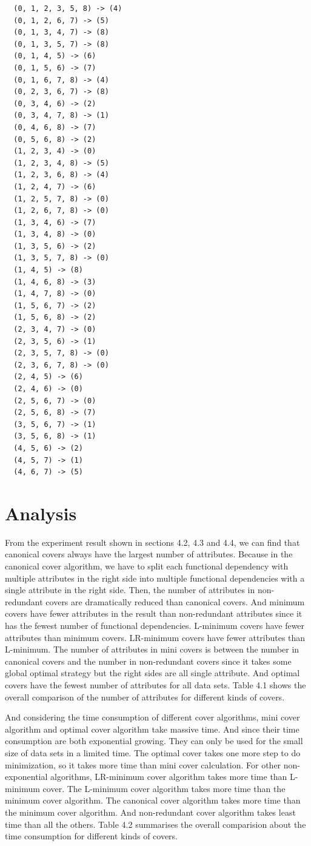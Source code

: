 \documentclass[11pt]{book}
\begin{document}
\begin{verbatim}
  (0, 1, 2, 3, 5, 8) -> (4)
  (0, 1, 2, 6, 7) -> (5)
  (0, 1, 3, 4, 7) -> (8)
  (0, 1, 3, 5, 7) -> (8)
  (0, 1, 4, 5) -> (6)
  (0, 1, 5, 6) -> (7)
  (0, 1, 6, 7, 8) -> (4)
  (0, 2, 3, 6, 7) -> (8)
  (0, 3, 4, 6) -> (2)
  (0, 3, 4, 7, 8) -> (1)
  (0, 4, 6, 8) -> (7)
  (0, 5, 6, 8) -> (2)
  (1, 2, 3, 4) -> (0)
  (1, 2, 3, 4, 8) -> (5)
  (1, 2, 3, 6, 8) -> (4)
  (1, 2, 4, 7) -> (6)
  (1, 2, 5, 7, 8) -> (0)
  (1, 2, 6, 7, 8) -> (0)
  (1, 3, 4, 6) -> (7)
  (1, 3, 4, 8) -> (0)
  (1, 3, 5, 6) -> (2)
  (1, 3, 5, 7, 8) -> (0)
  (1, 4, 5) -> (8)
  (1, 4, 6, 8) -> (3)
  (1, 4, 7, 8) -> (0)
  (1, 5, 6, 7) -> (2)
  (1, 5, 6, 8) -> (2)
  (2, 3, 4, 7) -> (0)
  (2, 3, 5, 6) -> (1)
  (2, 3, 5, 7, 8) -> (0)
  (2, 3, 6, 7, 8) -> (0)
  (2, 4, 5) -> (6)
  (2, 4, 6) -> (0)
  (2, 5, 6, 7) -> (0)
  (2, 5, 6, 8) -> (7)
  (3, 5, 6, 7) -> (1)
  (3, 5, 6, 8) -> (1)
  (4, 5, 6) -> (2)
  (4, 5, 7) -> (1)
  (4, 6, 7) -> (5)
\end{verbatim}


\section{Analysis}

From the experiment result shown in sections 4.2, 4.3 and 4.4, we can find that canonical covers always have the largest number of attributes. Because in the canonical cover algorithm, we have to split each functional dependency with multiple attributes in the right side into multiple functional dependencies with a single attribute in the right side. Then, the number of attributes in non-redundant covers are dramatically reduced than canonical covers. And minimum covers have fewer attributes in the result than non-redundant attributes since it has the fewest number of functional dependencies. L-minimum covers have fewer attributes than minimum covers. LR-minimum covers have fewer attributes than L-minimum. The number of attributes in mini covers is between  the number in canonical covers and the number in non-redundant covers since it takes some global optimal strategy but the right sides are all single attribute. And optimal covers have the fewest number of attributes for all data sets. Table 4.1 shows the overall comparison of the number of attributes for different kinds of covers.

And considering the time consumption of different cover algorithms, mini cover algorithm and optimal cover algorithm take massive time. And since their time consumption are both exponential growing. They can only be used for the small size of data sets in a limited time. The optimal cover takes one more step to do minimization, so it takes more time than mini cover calculation. For other non-exponential algorithms, LR-minimum cover algorithm takes more time than L-minimum cover. The L-minimum cover algorithm takes more time than the minimum cover algorithm. The canonical cover algorithm takes more time than the minimum cover algorithm. And non-redundant cover algorithm takes least time than all the others. Table 4.2 summarises the overall comparision about the time consumption for different kinds of covers.
\end{document}
